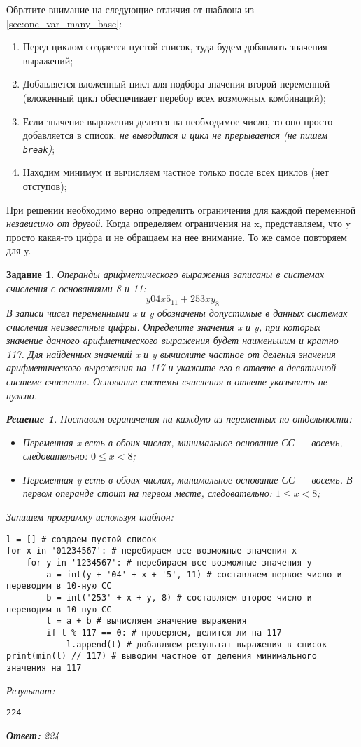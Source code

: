 \documentclass[12pt]{article}
\theoremstyle{problem_style}
\newtheorem{problem}{Задание}[subsection]
\newtheorem{solution}{Решение}[subsection]
\begin{document}
Обратите внимание на следующие отличия от шаблона из \autoref{sec:one_var_many_base}:
\begin{enumerate}
    \item Перед циклом создается пустой список, туда будем добавлять значения выражений;
    \item Добавляется вложенный цикл для подбора значения второй переменной (вложенный цикл обеспечивает перебор всех возможных комбинаций);
    \item Если значение выражения делится на необходимое число, то оно просто добавляется в список: \textit{не выводится и цикл не прерывается (не пишем \texttt{break})};
    \item Находим минимум и вычисляем частное только после всех циклов (нет отступов);
\end{enumerate}
При решении необходимо верно определить ограничения для каждой переменной \textit{независимо от другой}. Когда определяем ограничения на x, представляем, что y просто какая-то цифра и не обращаем на нее внимание. То же самое повторяем для y.
\begin{problem}
Операнды арифметического выражения записаны в системах счисления с основаниями 8 и 11:
\[
y04x5_{11} + 253xy_8
\]
В записи чисел переменными x и y обозначены допустимые в данных системах счисления неизвестные цифры. Определите значения x и y, при которых значение данного арифметического выражения будет наименьшим и кратно 117. Для найденных значений x и y вычислите частное от деления значения арифметического выражения на 117 и укажите его в ответе в десятичной системе счисления. Основание системы счисления в ответе указывать не нужно.
\begin{solution}
Поставим ограничения на каждую из переменных по отдельности:
\begin{itemize}
    \item Переменная x есть в обоих числах, минимальное основание СС — восемь, следовательно: $0 \leqslant x < 8$;
    \item Переменная y есть в обоих числах, минимальное основание СС — восемь. В первом операнде стоит на первом месте, следовательно: $1 \leqslant x < 8$;
\end{itemize}
Запишем программу используя шаблон:
\begin{verbatim}
l = [] # создаем пустой список
for x in '01234567': # перебираем все возможные значения x
    for y in '1234567': # перебираем все возможные значения y
        a = int(y + '04' + x + '5', 11) # составляем первое число и переводим в 10-ную СС
        b = int('253' + x + y, 8) # составляем второе число и переводим в 10-ную СС
        t = a + b # вычисляем значение выражения
        if t % 117 == 0: # проверяем, делится ли на 117
            l.append(t) # добавляем результат выражения в список
print(min(l) // 117) # выводим частное от деления минимального значения на 117
\end{verbatim}
Результат:
\begin{verbatim}
224
\end{verbatim}
\textbf{Ответ:} 224
\end{solution}
\end{problem}
\end{document}
